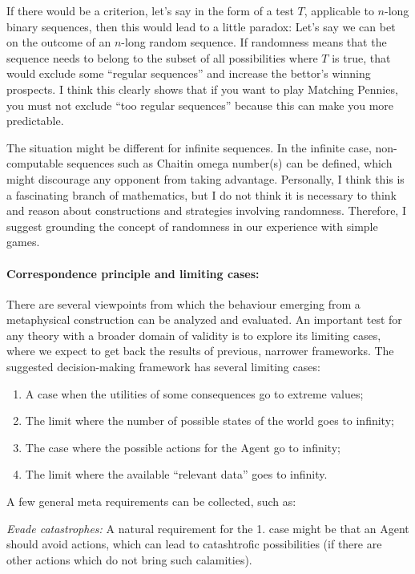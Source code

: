 \documentclass{article}
\begin{document}
If there would be a criterion, let's say in the form of a test $T$, applicable to $n$-long binary sequences, then this would lead to a little paradox:
Let's say we can bet on the outcome of an $n$-long random sequence. If randomness means that the sequence needs to belong to the subset of all possibilities where $T$ is true, that would exclude some ``regular sequences'' and increase the bettor's winning prospects.
I think this clearly shows that if you want to play Matching Pennies, you must not exclude ``too regular sequences'' because this can make you more predictable.

The situation might be different for infinite sequences. In the infinite case, non-computable sequences such as Chaitin omega number(s) can be defined, which might discourage any opponent from taking advantage.
Personally, I think this is a fascinating branch of mathematics, but I do not think it is necessary to think and reason about constructions and strategies involving randomness.
Therefore, I suggest grounding the concept of randomness in our experience with simple games.

\paragraph{Correspondence principle and limiting cases:}
There are several viewpoints from which the behaviour emerging from a metaphysical construction can be analyzed and evaluated. An important test for any theory with a broader domain of validity is to explore its limiting cases, where we expect to get back the results of previous, narrower frameworks. The suggested decision-making framework has several limiting cases:

\begin{enumerate}
    \item A case when the utilities of some consequences go to extreme values;
    \item The limit where the number of possible states of the world goes to infinity;
    \item The case where the possible actions for the Agent go to infinity;
    \item The limit where the available ``relevant data'' goes to infinity.
\end{enumerate}

A few general meta requirements can be collected, such as:

{\it Evade catastrophes:}
A natural requirement for the 1. case might be that an Agent should avoid actions, which can lead to catashtrofic possibilities (if there are other actions which do not bring such calamities).
\end{document}
